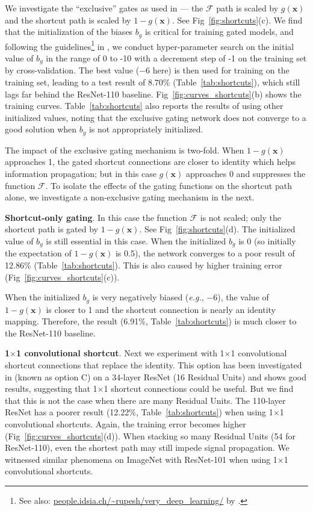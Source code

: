 \documentclass[runningheads]{llncs}
\def\eg{\emph{e.g.}}
\newcommand{\ve}[1]{\mathbf{#1}} \newcommand{\ma}[1]{\mathrm{#1}}
\begin{document}
We investigate the ``exclusive'' gates as used in \cite{Srivastava2015,Srivastava2015a} --- the $\mathcal{F}$ path is scaled by $g(\ve{x})$ and the shortcut path is scaled by $1-g(\ve{x})$. See Fig~\ref{fig:shortcuts}(c). We find that the initialization of the biases $b_g$ is critical for training gated models, and following the guidelines\footnote{See also: \url{people.idsia.ch/~rupesh/very_deep_learning/} by \cite{Srivastava2015,Srivastava2015a}.} in \cite{Srivastava2015,Srivastava2015a}, we conduct hyper-parameter search on the initial value of $b_g$ in the range of 0 to -10 with a decrement step of -1 on the training set by cross-validation. The best value ($-6$ here) is then used for training on the training set, leading to a test result of 8.70\% (Table~\ref{tab:shortcuts}), which still lags far behind the ResNet-110 baseline. Fig~\ref{fig:curves_shortcuts}(b) shows the training curves.
Table~\ref{tab:shortcuts} also reports the results of using other initialized values, noting that the exclusive gating network does not converge to a good solution when $b_g$ is not appropriately initialized.

The impact of the exclusive gating mechanism is two-fold. When $1-g(\ve{x})$ approaches 1, the gated shortcut connections are closer to identity which helps information propagation; but in this case $g(\ve{x})$ approaches 0 and suppresses the function $\mathcal{F}$. To isolate the effects of the gating functions on the shortcut path alone, we investigate a non-exclusive gating mechanism in the next.

\textbf{Shortcut-only gating}. In this case the function $\mathcal{F}$ is not scaled; only the shortcut path is gated by $1-g(\ve{x})$. See Fig~\ref{fig:shortcuts}(d). The initialized value of $b_g$ is still essential in this case. When the initialized $b_g$ is 0 (so initially the expectation of $1-g(\ve{x})$ is 0.5), the network converges to a poor result of 12.86\% (Table~\ref{tab:shortcuts}). This is also caused by higher training error (Fig~\ref{fig:curves_shortcuts}(c)).

When the initialized $b_g$ is very negatively biased (\eg, $-6$), the value of $1-g(\ve{x})$ is closer to 1 and the shortcut connection is nearly an identity mapping. Therefore, the result (6.91\%, Table~\ref{tab:shortcuts}) is much closer to the ResNet-110 baseline.

\textbf{1$\times$1 convolutional shortcut}. Next we experiment with 1$\times$1 convolutional shortcut connections that replace the identity. This option has been investigated in \cite{He2016} (known as option C) on a 34-layer ResNet (16 Residual Units) and shows good results, suggesting that 1$\times$1 shortcut connections could be useful. But we find that this is not the case when there are many Residual Units. The 110-layer ResNet has a poorer result (12.22\%, Table~\ref{tab:shortcuts}) when using 1$\times$1 convolutional shortcuts. Again, the training error becomes higher (Fig~\ref{fig:curves_shortcuts}(d)). When stacking so many Residual Units (54 for ResNet-110), even the shortest path may still impede signal propagation. We witnessed similar phenomena on ImageNet with ResNet-101 when using 1$\times$1 convolutional shortcuts.
\end{document}
